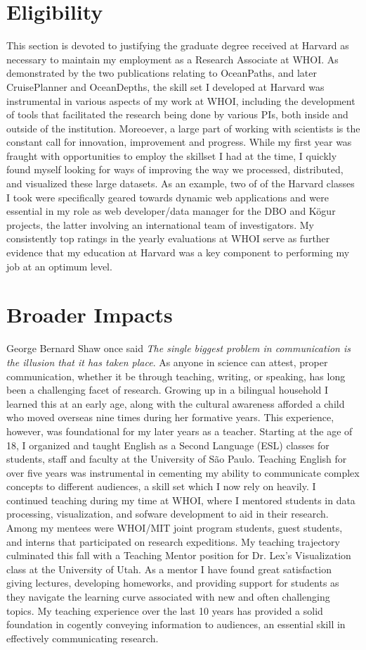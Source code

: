 \documentclass[timesfont,runinheadings]{nsfgrfp}
\begin{document}
\section*{Eligibility}
This section is devoted to justifying the graduate degree received at Harvard as necessary to maintain my employment as a Research Associate at WHOI. As demonstrated by the two publications relating to OceanPaths, and later CruisePlanner and OceanDepths, the skill set I  developed at Harvard was instrumental in various aspects of my work at WHOI, including the development of tools that facilitated the research being done by various PIs, both  inside  and  outside  of the institution.  Moreoever, a large part of working with scientists is the constant call for innovation, improvement and progress. While my first year was fraught with opportunities to employ the skillset I had at the time, I quickly found myself looking for ways of improving the way we processed, distributed, and visualized these large datasets. As an example, two of of the Harvard classes I took were specifically geared towards  dynamic web  applications and were  essential in my role as  web  developer/data manager for the DBO and K\"ogur projects, the latter involving an international team of investigators. My consistently top ratings in the yearly evaluations at WHOI serve as further evidence that my education at Harvard was a key component to performing my job at an optimum level.

\section*{Broader Impacts} 
George Bernard Shaw once said \textit{The single biggest problem in communication is the illusion that it has taken place}. As anyone in science can attest, proper communication, whether it be through teaching, writing, or speaking, has long been a challenging facet of research. Growing up in a bilingual household I learned this at an early age, along with the cultural awareness afforded a child who moved overseas nine times during her formative years. This experience, however, was foundational for my later years as a teacher. Starting at the age of 18, I organized and taught English as a Second Language (ESL) classes for students, staff and faculty at the University of S\~ao Paulo. Teaching English for over five years was instrumental in cementing my ability to communicate complex concepts to different audiences, a skill set which I now rely on heavily. I continued teaching during my time at WHOI, where I mentored students in data processing, visualization, and sofware development to aid in their research. Among my mentees were WHOI/MIT joint program students, guest students, and interns that participated on research expeditions. My teaching trajectory culminated this fall with a Teaching Mentor position for Dr. Lex's Visualization class at the University of Utah. As a mentor I have found great satisfaction giving lectures, developing homeworks, and providing support for students as they navigate the learning curve associated with new and often challenging topics. My teaching experience over the last 10 years has provided a solid foundation in cogently conveying information to audiences, an essential skill in effectively communicating research. 
\end{document}
